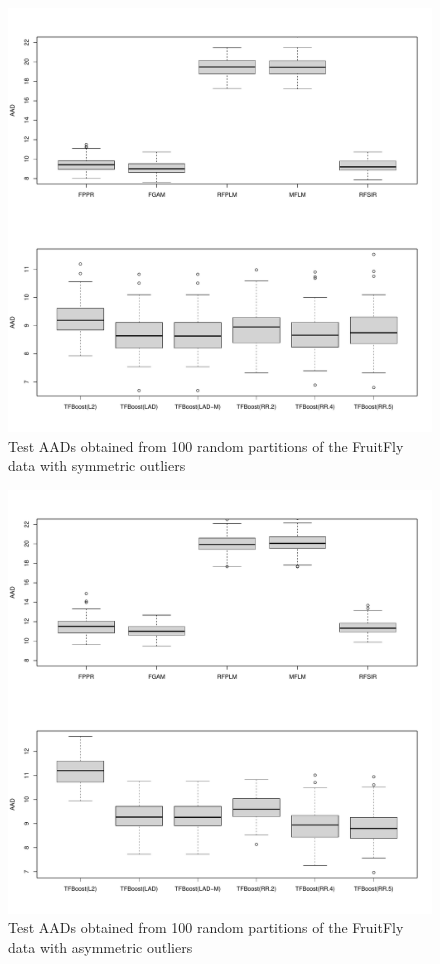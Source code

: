 \documentclass{article}
\begin{document}
\begin{figure}
	\includegraphics[scale = 0.5]{figs/Frui_Fly_B.pdf}
	\caption{Test AADs obtained from 100 random partitions of the FruitFly data with symmetric outliers}
\end{figure}


\begin{figure}
	\includegraphics[scale = 0.5]{figs/Frui_Fly_A.pdf}
	\caption{Test AADs  obtained from 100 random partitions of the FruitFly data with asymmetric outliers}
\end{figure}
\end{document}
